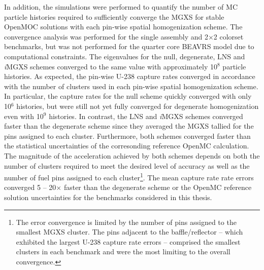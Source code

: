 In addition, the simulations were performed to quantify the number of \ac{MC} particle histories required to sufficiently converge the \ac{MGXS} for stable OpenMOC solutions with each pin-wise spatial homogenization scheme. The convergence analysis was performed for the single assembly and 2$\times$2 colorset benchmarks, but was not performed for the quarter core \ac{BEAVRS} model due to computational constraints. The eigenvalues for the null, degenerate, \ac{LNS} and \textit{i}\ac{MGXS} schemes converged to the same value with approximately 10$^{8}$ particle histories. As expected, the pin-wise U-238 capture rates converged in accordance with the number of clusters used in each pin-wise spatial homogenization scheme. In particular, the capture rates for the null scheme quickly converged with only 10$^{6}$ histories, but were still not yet fully converged for degenerate homogenization even with 10$^{9}$ histories. In contrast, the \ac{LNS} and \textit{i}\ac{MGXS} schemes converged faster than the degenerate scheme since they averaged the \ac{MGXS} tallied for the pins assigned to each cluster. Furthermore, both schemes converged faster than the statistical uncertainties of the corresonding reference OpenMC calculation. The magnitude of the acceleration achieved by both schemes depends on both the number of clusters required to meet the desired level of accuracy as well as the number of fuel pins assigned to each cluster\footnote{The error convergence is limited by the number of pins assigned to the smallest \ac{MGXS} cluster. The pins adjacent to the baffle/reflector -- which exhibited the largest U-238 capture rate errors -- comprised the smallest clusters in each benchmark and were the most limiting to the overall convergence.}. The mean capture rate rate errors converged 5 -- 20$\times$ faster than the degenerate scheme or the OpenMC reference solution uncertainties for the benchmarks considered in this thesis.




